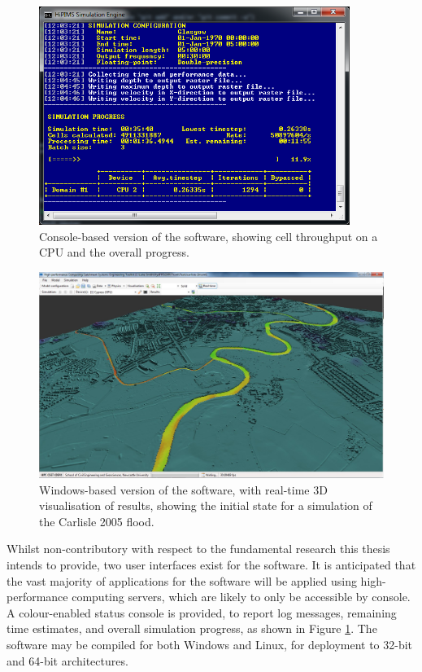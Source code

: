 \begin{figure}[tpb]
	\centering
	\includegraphics[width=0.9\textwidth]{software-figures/console-screenshot.png}
	\caption{Console-based version of the software, showing cell throughput on a CPU and the overall progress.}
	\label{Software_UI_Console}
\end{figure}
\begin{figure}[tpb]
	\centering
	\includegraphics[width=1.0\textwidth]{software-figures/interface-screenshot.jpg}
	\caption{Windows-based version of the software, with real-time 3D visualisation of results, showing the initial state for a simulation of the Carlisle 2005 flood.}
	\label{Software_UI_3D}
\end{figure}

Whilst non-contributory with respect to the fundamental research this thesis intends to provide, two user interfaces exist for the software. It is anticipated that the vast majority of applications for the software will be applied using high-performance computing servers, which are likely to only be accessible by console. A colour-enabled status console is provided, to report log messages, remaining time estimates, and overall simulation progress, as shown in Figure \ref{Software_UI_Console}. The software may be compiled for both Windows and Linux, for deployment to 32-bit and 64-bit architectures.

